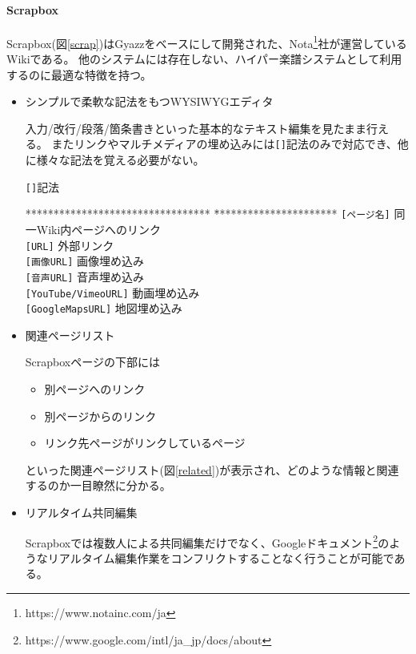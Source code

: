 \paragraph*{Scrapbox}
Scrapbox(図\ref{scrap})はGyazz\cite{Gyazz}をベースにして開発された、Nota\footnote{\textsf{https://www.notainc.com/ja}}社が運営しているWikiである。
他のシステムには存在しない、ハイパー楽譜システムとして利用するのに最適な特徴を持つ。

\begin{itemize}
    \item シンプルで柔軟な記法をもつWYSIWYGエディタ

    入力/改行/段落/箇条書きといった基本的なテキスト編集を見たまま行える。
    またリンクやマルチメディアの埋め込みには\texttt{[]}記法のみで対応でき、他に様々な記法を覚える必要がない。

    \begin{itembox}[l]{\texttt{[]}記法}
        \begin{tabbing}
            ********************************* \= ********************** \kill
            \texttt{[ページ名]} \> 同一Wiki内ページへのリンク\\
            \texttt{[URL]} \> 外部リンク\\
            \texttt{[画像URL]} \> 画像埋め込み\\
            \texttt{[音声URL]} \> 音声埋め込み\\
            \texttt{[YouTube/VimeoURL]} \> 動画埋め込み\\
            \texttt{[GoogleMapsURL]} \> 地図埋め込み
        \end{tabbing}
    \end{itembox}

    \item 関連ページリスト

    Scrapboxページの下部には
    \begin{itemize}
        \item 別ページへのリンク
        \item 別ページからのリンク
        \item リンク先ページがリンクしているページ
    \end{itemize}といった関連ページリスト(図\ref{related})が表示され、どのような情報と関連するのか一目瞭然に分かる。

    \item リアルタイム共同編集

    Scrapboxでは複数人による共同編集だけでなく、Googleドキュメント\footnote{\textsf{https://www.google.com/intl/ja\_jp/docs/about}}のようなリアルタイム編集作業をコンフリクトすることなく行うことが可能である。
\end{itemize}

